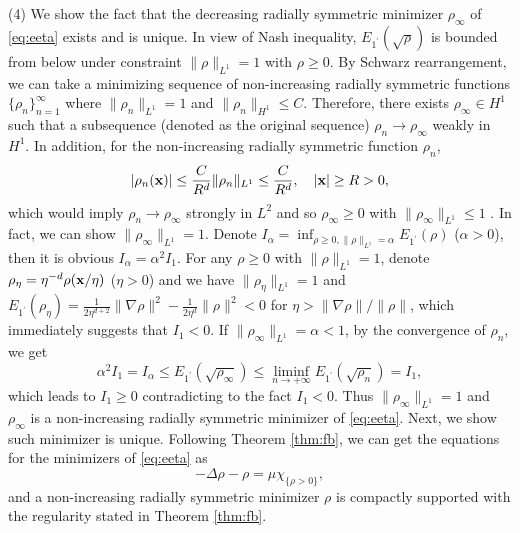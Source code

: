 \documentclass{elsarticle}
\newcommand{\be}{\begin{equation}}
\newcommand{\ee}{\end{equation}}
\newcommand{\bx}{{\bf x} }
\begin{document}
(4) We show the fact that the decreasing radially symmetric minimizer $\rho_\infty$ of \eqref{eq:eeta} exists and is unique.  In view of Nash inequality,
$E_{1^\prime}(\sqrt{\rho})$ is bounded from below
under constraint $\|\rho\|_{L^1}=1$ with $\rho\ge0$. By Schwarz rearrangement, we can take a minimizing sequence of non-increasing radially symmetric functions
 $\{\rho_n\}_{n=1}^\infty$ where $\|\rho_n\|_{L^1}=1$ and $\|\rho_n\|_{H^1}\leq C$. Therefore, there exists
 $\rho_\infty\in H^1$ such that a subsequence (denoted as the original sequence) $\rho_n\to \rho_\infty$ weakly in $H^1$.  %
   In addition, for the non-increasing radially symmetric function
 $\rho_n$,
 \be
 |\rho_n(\bx)|\leq \frac{C}{R^d}\|\rho_n\|_{L^1}\leq\frac{C}{R^d},\quad |\bx|\ge R>0,
 \ee
 which would imply $\rho_n\to \rho_\infty$ strongly in $L^2$ and so $\rho_\infty\ge0$ with $\|\rho_\infty\|_{L^1}\leq1$ . In fact, we can show $\|\rho_\infty\|_{L^1}=1$. Denote
 $I_\alpha=\inf_{\rho\ge0,\|\rho\|_{L^1}=\alpha} E_{1^\prime}(\rho)$ ($\alpha>0$), then it is obvious $I_\alpha=\alpha^2I_1$.
 For any $\rho\ge0$ with $\|\rho\|_{L^1}=1$, denote $\rho_{\eta}=\eta^{-d}\rho(\bx/\eta)$ ($\eta>0$) and
 we have $\|\rho_\eta\|_{L^1}=1$ and $E_{1^\prime}(\rho_\eta)=\frac{1}{2\eta^{d+2}}\|\nabla\rho\|^2-\frac{1}{2\eta^{d}}\|\rho\|^2<0$  for $\eta>\|\nabla\rho\|/\|\rho\|$,
 which immediately suggests that $I_1<0$. If $\|\rho_\infty\|_{L^1}=\alpha<1$, by the
 convergence of $\rho_n$, we get
 \be
 \alpha^2 I_1=I_\alpha\leq E_{1^\prime}(\sqrt{\rho_\infty})\leq \liminf\limits_{n\to+\infty}E_{1^\prime}(\sqrt{\rho_n})=I_1,
 \ee
 which leads to $I_1\ge0$ contradicting to the fact $I_1<0$. Thus $\|\rho_\infty\|_{L^1}=1$ and $\rho_\infty$ is a non-increasing radially symmetric minimizer of \eqref{eq:eeta}.
 Next, we show such minimizer is unique. Following Theorem \ref{thm:fb}, we can get the equations for the minimizers of \eqref{eq:eeta} as
 \be\label{eq:fb:3}
 -\Delta \rho-\rho=\mu\chi_{\{\rho>0\}},
 \ee
 and a  non-increasing radially symmetric minimizer  $\rho$ is compactly supported with the regularity stated in Theorem \ref{thm:fb}.
\end{document}
